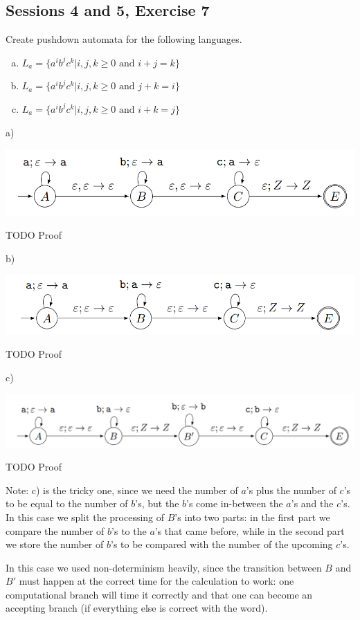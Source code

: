 \subsection{Sessions 4 and 5, Exercise 7}

\label{4_7}


Create pushdown automata for the following languages.
\begin{enumerate}[a)]
    \item $L_a = \{a^ib^jc^k | i,j,k \geq{} 0\text{ and }i+j = k\}$
    \item $L_a = \{a^ib^jc^k | i,j,k \geq{} 0\text{ and }j+k = i\}$
    \item $L_a = \{a^ib^jc^k | i,j,k \geq{} 0\text{ and }i+k = j\}$
\end{enumerate}



a)

\includegraphics[width=\linewidth]{04/4_7_a.png}

TODO Proof

b)

\includegraphics[width=\linewidth]{04/4_7_b.png}

TODO Proof

c)

\includegraphics[width=\linewidth]{04/4_7_c.png}

TODO Proof

Note: c) is the tricky one, since we need the number of $a$'s plus the number of $c$'s to be equal to the number of $b$'s, but the $b$'s come in-between the $a$'s and the $c$'s. In this case we split the processing of $B$'s into two parts: in the first part we compare the number of $b$'s to the $a$'s that came before, while in the second part we store the number of $b$'s to be compared with the number of the upcoming $c$'s.

In this case we used non-determinism heavily, since the transition between $B$ and $B'$ must happen at the correct time for the calculation to work: one computational branch will time it correctly and that one can become an accepting branch (if everything else is correct with the word).